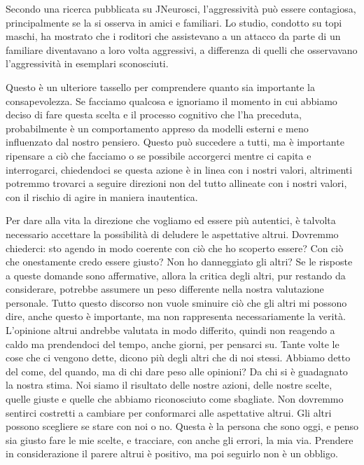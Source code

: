 \documentclass[12pt]{book} %
\begin{document}
Secondo una ricerca pubblicata su JNeurosci, l'aggressività può essere contagiosa, principalmente se la si osserva in amici e familiari. Lo studio, condotto su topi maschi, ha mostrato che i roditori che assistevano a un attacco da parte di un familiare diventavano a loro volta aggressivi, a differenza di quelli che osservavano l'aggressività in esemplari sconosciuti.

Questo è un ulteriore tassello per comprendere quanto sia importante la consapevolezza. Se facciamo qualcosa e ignoriamo
il momento in cui abbiamo deciso di fare questa scelta e il processo cognitivo che l'ha preceduta, probabilmente è un comportamento appreso da modelli esterni e meno influenzato dal nostro pensiero. Questo può succedere a
tutti, ma è importante ripensare a ciò che facciamo o se possibile accorgerci mentre ci capita e interrogarci,
chiedendoci se questa azione è in linea con i nostri valori, altrimenti potremmo trovarci a seguire direzioni non del tutto allineate con i nostri valori, con il rischio di agire in maniera inautentica.

Per dare alla vita la direzione che vogliamo ed essere più autentici, è talvolta necessario accettare la possibilità di deludere le aspettative altrui.
Dovremmo chiederci: sto agendo in modo coerente con ciò che ho scoperto essere? Con ciò che onestamente credo essere giusto? Non ho danneggiato gli altri? Se le risposte a queste domande sono affermative, allora la critica degli altri, pur restando da considerare, potrebbe assumere un peso differente nella nostra valutazione personale. Tutto questo discorso non vuole sminuire ciò che gli altri mi possono dire, anche questo è importante, ma non rappresenta necessariamente la verità.
L'opinione altrui andrebbe valutata in modo differito, quindi non reagendo a caldo ma prendendoci del tempo, anche giorni, per pensarci su. Tante volte le cose che ci vengono dette, dicono più degli altri che di noi stessi.
Abbiamo detto del come, del quando, ma di chi dare peso alle opinioni? Da chi si è guadagnato la nostra stima.
Noi siamo il risultato delle nostre azioni, delle nostre scelte, quelle giuste e quelle che abbiamo riconosciuto come sbagliate. Non dovremmo sentirci costretti a cambiare per conformarci alle aspettative altrui. Gli altri possono scegliere se stare con noi o no. Questa è la persona che sono oggi, e penso sia giusto fare le mie scelte, e tracciare, con anche gli errori, la mia via.
Prendere in considerazione il parere altrui è positivo, ma poi seguirlo non è un obbligo. 
\end{document}
